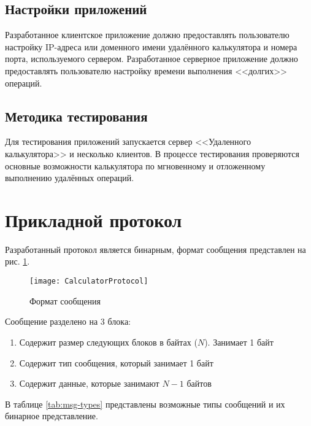 \subsection{Настройки приложений}

Разработанное клиентское приложение должно предоставлять пользователю настройку IP-адреса или доменного имени удалённого калькулятора и номера порта, используемого сервером. Разработанное серверное приложение должно предоставлять пользователю настройку времени выполнения <<долгих>> операций. 

\subsection{Методика тестирования}

Для тестирования приложений запускается сервер <<Удаленного калькулятора>> и несколько клиентов. В процессе тестирования проверяются основные возможности калькулятора по мгновенному и отложенному выполнению удалённых операций. 

\section{Прикладной протокол}

Разработанный протокол является бинарным, формат сообщения представлен на рис. \ref{fig:calc-prot}.

\begin{figure}[H]
	\centering
	\texttt{[image: CalculatorProtocol]}
	\caption{Формат сообщения}
	\label{fig:calc-prot}
\end{figure}

Сообщение разделено на 3 блока:

\begin{enumerate}
	\item Содержит размер следующих блоков в байтах ($N$). Занимает 1 байт
	\item Содержит тип сообщения, который занимает 1 байт
	\item Содержит данные, которые занимают $N-1$ байтов 
\end{enumerate}

В таблице \ref{tab:msg-types} представлены возможные типы сообщений и их бинарное представление.

